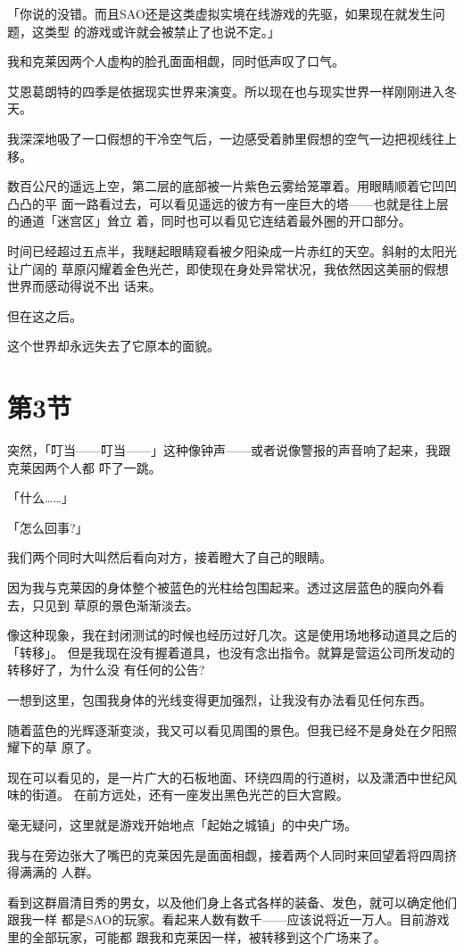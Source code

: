 \documentclass[11pt]{book}
\begin{document}
「你说的没错。而且SAO还是这类虚拟实境在线游戏的先驱，如果现在就发生问题，这类型
的游戏或许就会被禁止了也说不定。」

我和克莱因两个人虚构的脸孔面面相觑，同时低声叹了口气。

艾恩葛朗特的四季是依据现实世界来演变。所以现在也与现实世界一样刚刚进入冬天。

我深深地吸了一口假想的干冷空气后，一边感受着肺里假想的空气一边把视线往上移。

数百公尺的遥远上空，第二层的底部被一片紫色云雾给笼罩着。用眼睛顺着它凹凹凸凸的平
面一路看过去，可以看见遥远的彼方有一座巨大的塔——也就是往上层的通道「迷宫区」耸立
着，同时也可以看见它连结着最外圈的开口部分。

时间已经超过五点半，我瞇起眼睛窥看被夕阳染成一片赤红的天空。斜射的太阳光让广阔的
草原闪耀着金色光芒，即使现在身处异常状况，我依然因这美丽的假想世界而感动得说不出
话来。

但在这之后。

这个世界却永远失去了它原本的面貌。
\section{第3节}
\label{sec:org9c90b89}
突然，「叮当——叮当——」这种像钟声——或者说像警报的声音响了起来，我跟克莱因两个人都
吓了一跳。

「什么……」

「怎么回事?」

我们两个同时大叫然后看向对方，接着瞪大了自己的眼睛。

因为我与克莱因的身体整个被蓝色的光柱给包围起来。透过这层蓝色的膜向外看去，只见到
草原的景色渐渐淡去。

像这种现象，我在封闭测试的时候也经历过好几次。这是使用场地移动道具之后的「转移」。
但是我现在没有握着道具，也没有念出指令。就算是营运公司所发动的转移好了，为什么没
有任何的公告?

一想到这里，包围我身体的光线变得更加强烈，让我没有办法看见任何东西。

随着蓝色的光辉逐渐变淡，我又可以看见周围的景色。但我已经不是身处在夕阳照耀下的草
原了。

现在可以看见的，是一片广大的石板地面、环绕四周的行道树，以及潇洒中世纪风味的街道。
在前方远处，还有一座发出黑色光芒的巨大宫殿。

毫无疑问，这里就是游戏开始地点「起始之城镇」的中央广场。

我与在旁边张大了嘴巴的克莱因先是面面相觑，接着两个人同时来回望着将四周挤得满满的
人群。

看到这群眉清目秀的男女，以及他们身上各式各样的装备、发色，就可以确定他们跟我一样
都是SAO的玩家。看起来人数有数千——应该说将近一万人。目前游戏里的全部玩家，可能都
跟我和克莱因一样，被转移到这个广场来了。
\end{document}
